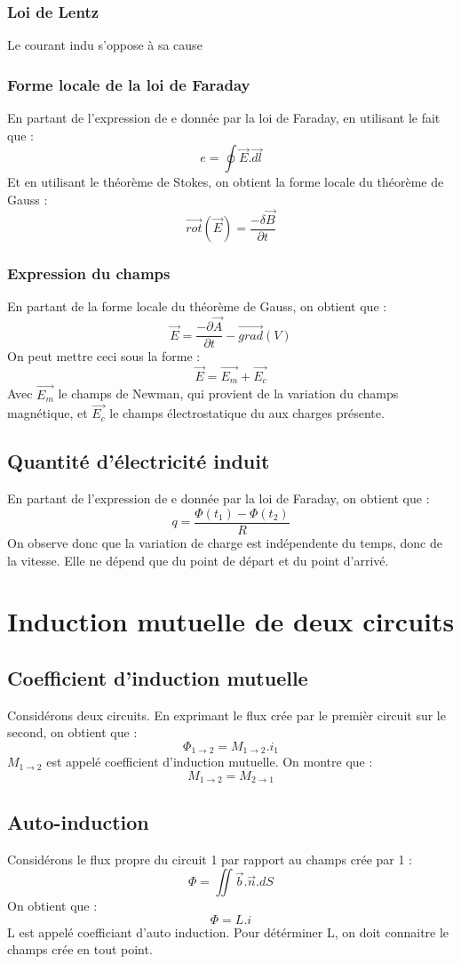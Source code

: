 \subsubsection{Loi de Lentz}
\begin{enon}
Le courant indu s'oppose à sa cause
\end{enon}
\subsubsection{Forme locale de la loi de Faraday}
En partant de l'expression de e donnée par la loi de Faraday, en utilisant le fait que : 
$$e = \oint \overrightarrow{E}.\overrightarrow{dl}$$
Et en utilisant le théorème de Stokes, on obtient la forme locale du théorème de Gauss :
$$\overrightarrow{rot}(\overrightarrow{E}) = \dfrac{-\delta\overrightarrow{B}}{\partial t}$$
\subsubsection{Expression du champs}
En partant de la forme locale du théorème de Gauss, on obtient que :
$$\overrightarrow{E} = \dfrac{-\partial \overrightarrow{A}}{\partial t} - \overrightarrow{grad}(V)$$
On peut mettre ceci sous la forme : 
$$\overrightarrow{E} = \overrightarrow{E_m} + \overrightarrow{E_{c}}$$
Avec $\overrightarrow{E_m}$ le champs de Newman, qui provient de la variation du champs magnétique, et $\overrightarrow{E_c}$ le champs électrostatique du aux charges présente.
\subsection{Quantité d'électricité induit}
En partant de l'expression de e donnée par la loi de Faraday, on obtient que :
$$q = \dfrac{\Phi(t_1)-\Phi(t_2)}{R}$$
On observe donc que la variation de charge est indépendente du temps, donc de la vitesse. Elle ne dépend que du point de départ et du point d'arrivé.
\section{Induction mutuelle de deux circuits}
\subsection{Coefficient d'induction mutuelle}
\begin{enon}
Considérons deux circuits. En exprimant le flux crée par le premièr circuit sur le second, on obtient que : 
$$\Phi_{1 \rightarrow 2 } = M_{1\rightarrow 2}.i_1$$
$M_{1\rightarrow2}$ est appelé coefficient d'induction mutuelle. On montre que : 
$$M_{1\rightarrow 2} = M_{2 \rightarrow 1}$$
\end{enon}
\subsection{Auto-induction}
Considérons le flux propre du circuit 1 par rapport au champs crée par 1 : 
$$\Phi = \iint \overrightarrow{b}.\overrightarrow{n}.dS$$
On obtient que :
$$\Phi = L.i$$
L est appelé coefficiant d'auto induction. Pour détérminer L, on doit connaitre le champs crée en tout point.
